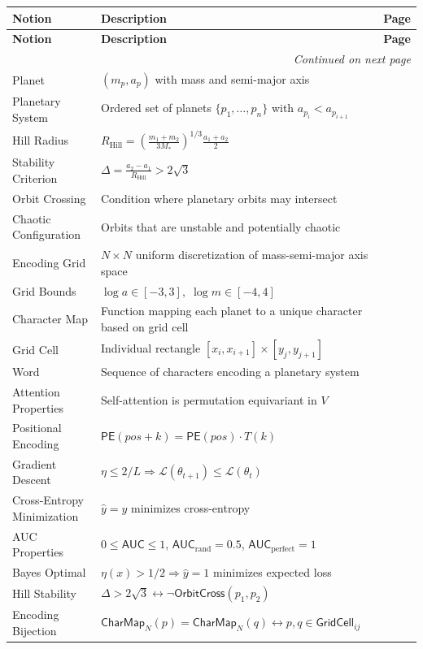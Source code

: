 \documentclass{amsart}
\newenvironment{notiontable}{%
	\renewcommand{\arraystretch}{1.2}%
	\setlength{\tabcolsep}{4pt}%
	\begin{longtable}{|l|p{10cm}|c|}
		\hline
		\textbf{Notion} & \textbf{Description} & \textbf{Page} \\
		\hline
		\endfirsthead
		\hline
		\textbf{Notion} & \textbf{Description} & \textbf{Page} \\
		\hline
		\endhead
		\hline
		\multicolumn{3}{r}{\textit{Continued on next page}} \\
		\endfoot
		\hline
		\endlastfoot
}{%
	\end{longtable}%
}
\theoremstyle{break}
\begin{document}
\begin{notiontable}
		Planet & $(m_p, a_p)$ with mass and semi-major axis & \pageref{def:planet} \\
		Planetary System & Ordered set of planets $\{p_1, \ldots, p_n\}$ with $a_{p_i} < a_{p_{i+1}}$ & \pageref{def:system} \\
		Hill Radius & $R_{\mathrm{Hill}} = \left(\frac{m_1+m_2}{3M_*}\right)^{1/3} \frac{a_1+a_2}{2}$ & \pageref{def:hill-radius} \\
		Stability Criterion & $\Delta = \frac{a_2 - a_1}{R_{\mathrm{Hill}}} > 2\sqrt{3}$ & \pageref{def:critical-stability} \\
		Orbit Crossing & Condition where planetary orbits may intersect & \pageref{def:orbit-cross} \\
		Chaotic Configuration & Orbits that are unstable and potentially chaotic & \pageref{def:chaotic} \\
		Encoding Grid & $N \times N$ uniform discretization of mass-semi-major axis space & \pageref{def:encoding-grid} \\
		Grid Bounds & $\log a \in [-3, 3],\; \log m \in [-4, 4]$ & \pageref{def:encoding-bounds} \\
		Character Map & Function mapping each planet to a unique character based on grid cell & \pageref{def:character-map} \\
		Grid Cell & Individual rectangle $[x_i, x_{i+1}] \times [y_j, y_{j+1}]$ & \pageref{def:grid-cell} \\
		Word & Sequence of characters encoding a planetary system & \pageref{def:word} \\
		
		Attention Properties & Self-attention is permutation equivariant in $V$ & \pageref{thm:attention-properties} \\
		Positional Encoding & $\mathsf{PE}(pos+k) = \mathsf{PE}(pos) \cdot T(k)$ & \pageref{thm:positional-encoding} \\
		Gradient Descent & $\eta \le 2/L \Rightarrow \mathcal{L}(\theta_{t+1}) \le \mathcal{L}(\theta_t)$ & \pageref{thm:gradient-descent} \\
		Cross-Entropy Minimization & $\hat{y} = y$ minimizes cross-entropy & \pageref{thm:cross-entropy-minimization} \\
		AUC Properties & $0 \le \mathsf{AUC} \le 1$, $\mathsf{AUC}_{\text{rand}} = 0.5$, $\mathsf{AUC}_{\text{perfect}} = 1$ & \pageref{thm:auc-properties} \\
		Bayes Optimal & $\eta(x) > 1/2 \Rightarrow \hat{y}=1$ minimizes expected loss & \pageref{thm:bayes-optimal} \\
		Hill Stability & $\Delta > 2\sqrt{3} \leftrightarrow \neg \mathsf{OrbitCross}(p_1,p_2)$ & \pageref{thm:hill-stability} \\
		Encoding Bijection & $\mathsf{CharMap}_N(p) = \mathsf{CharMap}_N(q) \leftrightarrow p,q \in \mathsf{GridCell}_{ij}$ & \pageref{thm:encoding-bijection} \\
		

\end{notiontable}
\end{document}
